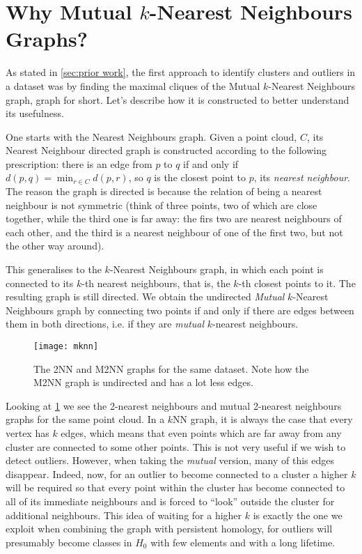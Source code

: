 \documentclass[../main.tex]{subfiles}
\begin{document}
\section{Why Mutual \texorpdfstring{\( k \)}{k}-Nearest Neighbours Graphs?}
As stated in \cref{sec:prior work}, the first approach to identify clusters and outliers
in a dataset was by finding the maximal cliques of the Mutual \( k \)-Nearest Neighbours
graph, \MKNN graph for short. Let's describe how it is constructed to better understand
its usefulness. 

One starts with the Nearest Neighbours graph. Given a point cloud, \( C
\), its Nearest Neighbour directed graph is constructed according to the following
prescription: there is an edge from \( p \) to \( q \) if and only if \( d(p,q) = \min_{r
	\in C} d(p,r) \), so \( q \) is the closest point to \( p \), its \emph{nearest
neighbour}. The reason the graph is directed is because the relation of being a nearest
neighbour is not symmetric (think of three points, two of which are close together, while
the third one is far away: the firs two are nearest neighbours of each other, and the
third is a nearest neighbour of one of the first two, but not the other way around). 

This generalises to the \( k \)-Nearest Neighbours graph, in which each point is connected
to its \( k \)-th nearest neighbours, that is, the \( k \)-th closest points to it. The
resulting graph is still directed. We obtain the undirected \emph{Mutual} \( k \)-Nearest
Neighbours graph by connecting two points if and only if there are edges between them
in both directions, i.e. if they are \emph{mutual} \( k \)-nearest neighbours. 

\begin{figure}[htb]
	\centering
	\texttt{[image: mknn]}
	\caption{The 2NN and M2NN graphs for the same dataset. Note how the M2NN graph is
	undirected and has a lot less edges.}
	\label{fig:mknn}
\end{figure}

Looking at \cref{fig:mknn} we see the 2-nearest neighbours and mutual 2-nearest neighbours
graphs for the same point cloud. In a \( k \)NN	 graph, it is always the case that every
vertex has \( k \) edges, which means that even points which are far away from any cluster
are connected to some other points. This is not very useful if we wish to detect outliers.
However, when taking the \emph{mutual} version, many of this edges disappear. Indeed, now,
for an outlier to become connected to a cluster a higher \( k \) will be required so that
every point within the cluster has become connected to all of its immediate neighbours and
is forced to ``look'' outside the cluster for additional neighbours. This idea of waiting
for a higher \( k \) is exactly the one we exploit when combining the \MKNN graph with
persistent homology, for outliers will presumably become classes in	\( H_0 \) with few
elements and with a long lifetime. 
\end{document}
